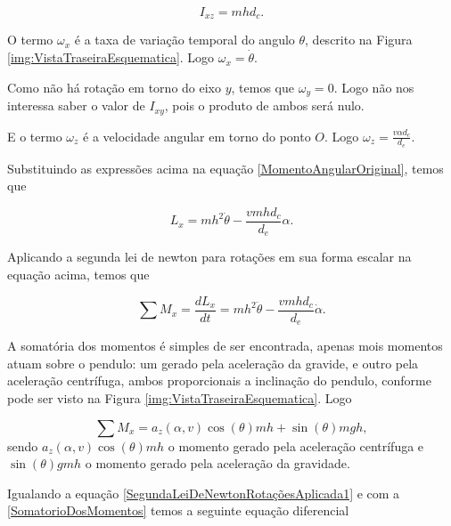        \begin{equation}
            I_{xz}=mhd_c.
        \end{equation}
        
        O termo $\omega_x$ é a taxa de variação temporal do angulo $\theta$, descrito na Figura \ref{img:VistaTraseiraEsquematica}. Logo $\omega_x = \dot \theta$.
        
        Como não há rotação em torno do eixo $y$, temos que $\omega_y=0$. Logo não nos interessa saber o valor de $I_{xy}$, pois o produto de ambos será nulo.
        
        E o termo $\omega_z$ é a velocidade angular em torno do ponto $O$. Logo $\omega_z = \frac{v \alpha d_c}{d_e}$.
        
        Substituindo as expressões acima na equação \ref{MomentoAngularOriginal}, temos que
        
        \begin{equation}
            L_x = mh^2 \dot \theta - \frac{vmhd_c}{d_e}\alpha.
        \end{equation}
        
        Aplicando a segunda lei de newton para rotações em sua forma escalar na equação acima, temos que
        
        \begin{equation}
            \sum M_x = \frac{d L_x}{dt} = mh^2 \ddot \theta - \frac{vmhd_c}{d_e}\dot \alpha.
            \label{SegundaLeiDeNewtonRotaçõesAplicada1}
        \end{equation}
        
        A somatória dos momentos é simples de ser encontrada, apenas mois momentos atuam sobre o pendulo: um gerado pela aceleração da gravide, e outro pela aceleração centrífuga, ambos proporcionais a inclinação do pendulo, conforme pode ser visto na Figura \ref{img:VistaTraseiraEsquematica}. Logo
    
        \begin{equation}
            \sum M_x  = a_z(\alpha,v) \cos(\theta)mh + \sin(\theta)mgh,
            \label{SomatorioDosMomentos}
        \end{equation}
        sendo $a_z(\alpha,v) \cos(\theta)mh$ o momento gerado pela aceleração centrífuga e $\sin(\theta)gmh$ o momento gerado pela aceleração da gravidade.
        
        Igualando a equação \ref{SegundaLeiDeNewtonRotaçõesAplicada1} e com a \ref{SomatorioDosMomentos} temos a seguinte equação diferencial
        
